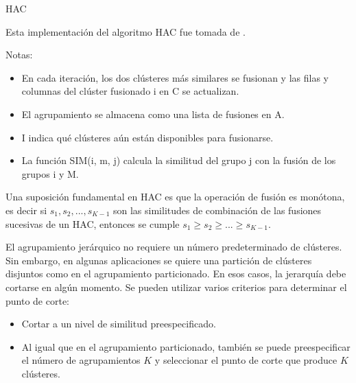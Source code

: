 \documentclass{llncs}
\DeclareMathOperator*{\argmax}{arg\,max}
\begin{document}
\begin{algorithm}
	\caption{HAC}
	\begin{algorithmic}[1]
		\EndFor
		\EndFor
		\State{$ <i,m> \leftarrow \argmax_{<i,m>:i \neq \wedge I[i] = 1 \wedge I[m] = 1} C[i][m] $}
		\EndFor
		\EndFor
	\end{algorithmic}
\end{algorithm}

\newpage
Esta implementaci\'on del algoritmo HAC fue tomada de \cite[Figura 17.2, p.381]{B1}.

\vspace{0.5em}
Notas: 
\begin{itemize}
	\item En cada iteración, los dos clústeres m\'as similares se fusionan y las filas y columnas del clúster fusionado i en C se actualizan.
	\item El agrupamiento se almacena como una lista de fusiones en A.
	\item I indica qué clústeres aún están disponibles para fusionarse. 
	\item La función SIM(i, m, j) calcula la similitud del grupo j con la fusión de los grupos i y M.
\end{itemize}

Una suposición fundamental en HAC es que la operación de fusión es mon\'otona, es decir si $ s_{1}, s_{2}, . . . , s_{K-1}$ son las similitudes de combinación de las fusiones sucesivas de un HAC, entonces se cumple $ s_{1} \geq s_{2} \geq . . . \geq s_{K-1}$.

El agrupamiento jerárquico no requiere un número predeterminado de clústeres. Sin embargo, en algunas aplicaciones se quiere una partición de clústeres disjuntos como en el agrupamiento particionado. En esos casos, la jerarquía debe cortarse en algún momento. Se pueden utilizar varios criterios para determinar el punto de corte:
\begin{itemize}
	\item Cortar a un nivel de similitud preespecificado.
	\item Al igual que en el agrupamiento particionado, también se puede preespecificar el número de agrupamientos $ K $ y seleccionar el punto de corte que produce $ K $ cl\'usteres.
\end{itemize}
\end{document}
